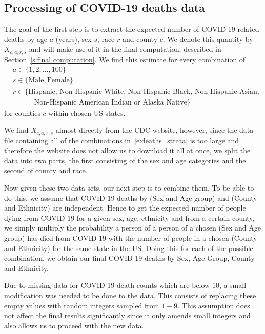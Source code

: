\documentclass[11pt]{article}
\begin{document}
\subsection{Processing of COVID-19 deaths data}\label{s:processing of covid-19 deaths}
The goal of the first step is to extract the expected number of COVID-19-related deaths by age $a$ (years), sex $s$, race $r$ and county $c$. We denote this quantity by $X_{c,a,r,s}$ and will make use of it in the final computation, described in Section~\ref{s:final computation}. We find this estimate for every combination of 
\begin{subequations}\label{e:deaths_strata}
\begin{align}
    & a \in \{1, 2, ..., 100\} \\ \label{s:1a}
    & s \in \{\textrm{Male}, \textrm{Female}\}\\ \label{s:1b}
    & r \in \{\textrm{Hispanic, Non-Hispanic White, Non-Hispanic Black, Non-Hispanic Asian},\\  \label{s:1c}
    & \quad\quad\quad \textrm{Non-Hispanic American Indian or Alaska Native}\}
\end{align}
\end{subequations}
for counties $c$ within chosen US states.

We find $X_{c,a,r,s}$ almost directly from the CDC website, however, since the data file containing all of the combinations in~\eqref{e:deaths_strata} is too large and therefore the website does not allow us to download it all at once, we split the data into two parts, the first consisting of the sex and age\cite{COVID_19_Deaths_by_sex_and_age} categories and the second of county and race.\cite{COVID_19_Deaths_by_county_and_race}

Now given these two data sets, our next step is to combine them. To be able to do this, we assume that COVID-19 deaths by (Sex and Age group) and (County and Ethnicity) are independent. Hence to get the expected number of people dying from COVID-19 for  a given sex, age, ethnicity and from a certain county, we simply multiply the probability a person of a person of a chosen (Sex and Age group) has died from COVID-19 with the number of people in a chosen (County and Ethnicity) for the same state in the US. Doing this for each of the possible combination, we obtain our final COVID-19 deaths by Sex, Age Group, County and Ethnicity.

Due to missing data for COVID-19 death counts which are below $10$, a small modification was needed to be done to the data. This consists of replacing these empty values with random integers sampled from $1-9$. This assumption does not affect the final results significantly since it only amends small integers and also allows us to proceed with the new data. 
\end{document}
